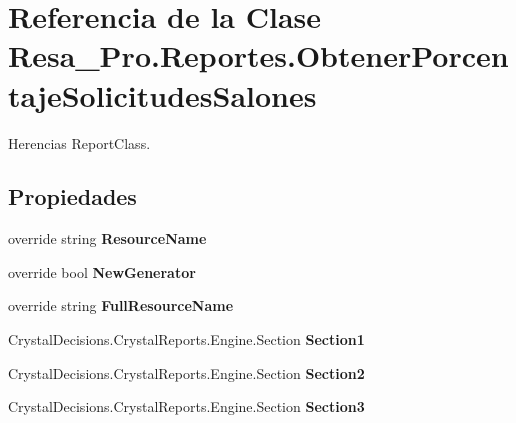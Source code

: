 \section{Referencia de la Clase Resa\+\_\+\+Pro.\+Reportes.\+Obtener\+Porcentaje\+Solicitudes\+Salones}
\label{class_resa___pro_1_1_reportes_1_1_obtener_porcentaje_solicitudes_salones}


Herencias Report\+Class.

\subsection*{Propiedades}
\begin{DoxyCompactItemize}
\item 
override string {\bfseries Resource\+Name}\hspace{0.3cm}{\ttfamily  [get, set]}\label{class_resa___pro_1_1_reportes_1_1_obtener_porcentaje_solicitudes_salones_af6494f85a20291437af4321c3a6a74e4}

\item 
override bool {\bfseries New\+Generator}\hspace{0.3cm}{\ttfamily  [get, set]}\label{class_resa___pro_1_1_reportes_1_1_obtener_porcentaje_solicitudes_salones_ac7d58c5c6af51a19367e1d0667968f68}

\item 
override string {\bfseries Full\+Resource\+Name}\hspace{0.3cm}{\ttfamily  [get, set]}\label{class_resa___pro_1_1_reportes_1_1_obtener_porcentaje_solicitudes_salones_a8629035bd9fbcb5e4649696a8d3e886e}

\item 
Crystal\+Decisions.\+Crystal\+Reports.\+Engine.\+Section {\bfseries Section1}\hspace{0.3cm}{\ttfamily  [get]}\label{class_resa___pro_1_1_reportes_1_1_obtener_porcentaje_solicitudes_salones_aec2e15f542bddd95f8c918e670c3f8b4}

\item 
Crystal\+Decisions.\+Crystal\+Reports.\+Engine.\+Section {\bfseries Section2}\hspace{0.3cm}{\ttfamily  [get]}\label{class_resa___pro_1_1_reportes_1_1_obtener_porcentaje_solicitudes_salones_a6fc51bce7735f2764c85f6c47a78ac88}

\item 
Crystal\+Decisions.\+Crystal\+Reports.\+Engine.\+Section {\bfseries Section3}\hspace{0.3cm}{\ttfamily  [get]}\label{class_resa___pro_1_1_reportes_1_1_obtener_porcentaje_solicitudes_salones_a105905bfdfba73a1bf33ca88aea444d8}


\end{DoxyCompactItemize}
